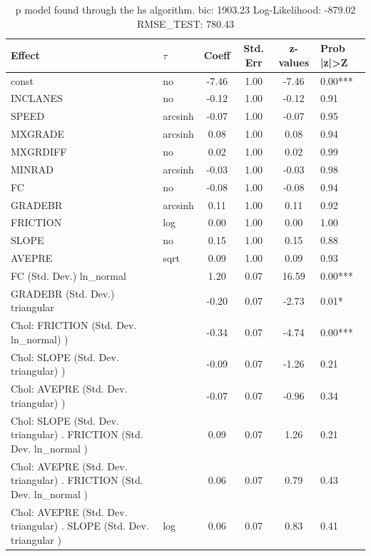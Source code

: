 \begin{table}
	\caption{p model found through the hs algorithm. bic: 1903.23 Log-Likelihood: -879.02 RMSE_TEST: 780.43}
	\begin{center}
		\begin{tabular}{|l|l|c|c|c|l|}
			\hline
			Effect & $\tau$ & Coeff & Std. Err & z-values & Prob |z|>Z \\
			\hline
			const & no & -7.46 & 1.00 & -7.46 & 0.00*** \\
			\hline
			INCLANES & no & -0.12 & 1.00 & -0.12 & 0.91 \\
			\hline
			SPEED & arcsinh & -0.07 & 1.00 & -0.07 & 0.95 \\
			\hline
			MXGRADE & arcsinh & 0.08 & 1.00 & 0.08 & 0.94 \\
			\hline
			MXGRDIFF & no & 0.02 & 1.00 & 0.02 & 0.99 \\
			\hline
			MINRAD & arcsinh & -0.03 & 1.00 & -0.03 & 0.98 \\
			\hline
			FC & no & -0.08 & 1.00 & -0.08 & 0.94 \\
			\hline
			GRADEBR & arcsinh & 0.11 & 1.00 & 0.11 & 0.92 \\
			\hline
			FRICTION & log & 0.00 & 1.00 & 0.00 & 1.00 \\
			\hline
			SLOPE & no & 0.15 & 1.00 & 0.15 & 0.88 \\
			\hline
			AVEPRE & sqrt & 0.09 & 1.00 & 0.09 & 0.93 \\
			\hline
			FC (Std. Dev.) ln_normal &  & 1.20 & 0.07 & 16.59 & 0.00*** \\
			\hline
			GRADEBR (Std. Dev.) triangular &  & -0.20 & 0.07 & -2.73 & 0.01* \\
			\hline
			 Chol: FRICTION (Std. Dev. ln_normal) ) &  & -0.34 & 0.07 & -4.74 & 0.00*** \\
			\hline
			 Chol: SLOPE (Std. Dev. triangular) ) &  & -0.09 & 0.07 & -1.26 & 0.21 \\
			\hline
			 Chol: AVEPRE (Std. Dev. triangular) ) &  & -0.07 & 0.07 & -0.96 & 0.34 \\
			\hline
			 Chol: SLOPE (Std. Dev. triangular) . FRICTION (Std. Dev.   ln_normal ) &  & 0.09 & 0.07 & 1.26 & 0.21 \\
			\hline
			 Chol: AVEPRE (Std. Dev. triangular) . FRICTION (Std. Dev.   ln_normal ) &  & 0.06 & 0.07 & 0.79 & 0.43 \\
			\hline
			 Chol: AVEPRE (Std. Dev. triangular) . SLOPE (Std. Dev.   triangular ) & log & 0.06 & 0.07 & 0.83 & 0.41 \\

\end{tabular}
\end{center}
\end{table}
